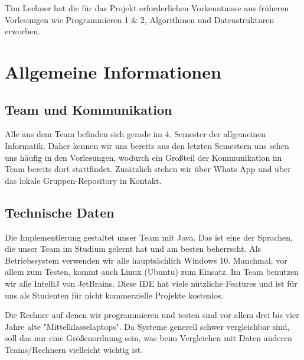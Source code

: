 \documentclass[12pt,a4paper,bibliography=totocnumbered,listof=totocnumbered]{scrartcl}
\begin{document}
Tim Lechner hat die für das Projekt erforderlichen Vorkenntnisse aus früheren Vorlesungen wie Programmieren 1 \& 2, Algorithmen und Datenstrukturen erworben.


\newpage
\section{Allgemeine Informationen}
\subsection{Team und Kommunikation}
Alle aus dem Team befinden sich gerade im 4. Semester der allgemeinen Informatik. Daher kennen wir uns bereits aus den letzten Semestern uns sehen uns häufig in den Vorlesungen, wodurch ein Großteil der Kommunikation im Team bereits dort stattfindet. Zusätzlich stehen wir über Whats App und über das lokale Gruppen-Repository in Kontakt. 

\subsection{Technische Daten}

Die Implementierung gestaltet unser Team mit Java. Das ist eine der Sprachen, die unser Team im Studium gelernt hat und am besten beherrscht. Als Betriebssystem verwenden wir alle hauptsächlich Windows 10. Manchmal, vor allem zum Testen, kommt auch Linux (Ubuntu) zum Einsatz. Im Team benutzen wir  alle IntelliJ von JetBrains. Diese IDE hat viele nützliche Features und ist für uns als Studenten für nicht kommerzielle Projekte kostenlos.

Die Rechner auf denen wir programmieren und testen sind vor allem drei bis vier Jahre alte "Mittelklasselaptops". Da Systeme generell schwer vergleichbar sind, soll das nur eine Größenordnung sein, was beim Vergleichen mit Daten anderen Teams/Rechnern vielleicht wichtig ist. 
\end{document}
